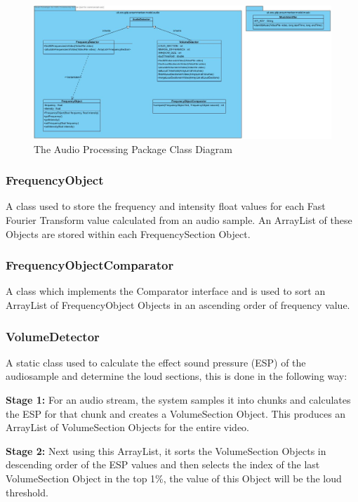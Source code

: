 \begin{figure}[h1]
\begin{center}
 \includegraphics[trim = 0mm 0mm 0mm 0mm, clip,
 scale=0.33]{Images/audio_package_class_diagram.jpg}
  \caption{The Audio Processing Package Class Diagram}
 \end{center}
\end{figure}

\subsubsection{FrequencyObject}
A class used to store the frequency and intensity float values for each Fast Fourier Transform value calculated from an audio sample. An ArrayList of these Objects are stored within each FrequencySection Object.

\subsubsection{FrequencyObjectComparator}
A class which implements the Comparator interface and is used to sort an ArrayList
of FrequencyObject Objects in an ascending order of frequency value.

\subsubsection{VolumeDetector}

A static class used to calculate the effect sound pressure (ESP) of the audiosample and determine the loud sections, this is done in the following way:

\textbf{Stage 1:} For an audio stream, the system samples it into chunks and calculates the ESP for that chunk and creates a VolumeSection Object. This produces an ArrayList of VolumeSection Objects for the entire video.

\textbf{Stage 2:} Next using this ArrayList, it sorts the VolumeSection Objects in descending order of the ESP values and then selects the index of the last VolumeSection Object in the top 1\%, the value of this Object will be the loud threshold.

